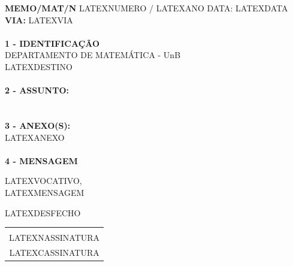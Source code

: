 \documentclass[12pt]{artigo_novo}
\begin{document}
\vspace*{.8cm}
\timbrado
\setlength{\baselineskip}{5mm}
\noindent 
\begin{minipage}{16cm}
\vspace*{-8mm}
\parindent=1.2cm
\setlength{\baselineskip}{5mm}
\vspace*{.2cm}
\noindent
\small
{\bf  MEMO/MAT/N\primo} LATEXNUMERO / LATEXANO \hfill {DATA:} {LATEXDATA}
\vum \\
{\bf VIA:} {LATEXVIA}  
\\
\mbox{} \hrulefill\
\\
{\bf 1 - IDENTIFICA\c{C}\~AO} 
\\
\phantom{xxx}{\bf Proced\^encia:} {DEPARTAMENTO DE MATEM\'ATICA - UnB}
\\
 {LATEXDESTINO}
\\
\mbox{} \hrulefill\
\\
{\bf 2 - ASSUNTO:} \\
\phantom{xxx}{LATEXASSUNTO}
\\
\mbox{} \hrulefill\
\\
{\bf 3 - ANEXO(S):} 
\\
\phantom{xxx} {LATEXANEXO}
\\
\mbox{} \hrulefill\
\\
{ \bf 4 - MENSAGEM} 
\end{minipage}
\setlength{\baselineskip}{5mm}
\vspace*{.92cm} 

LATEXVOCATIVO,
\vspace*{8mm} \\
\noindent 
LATEXMENSAGEM 
\vspace*{8mm} 
\hspace*{8cm} 
\setlength{\baselineskip}{5mm}
\vspace*{10mm} 

LATEXDESFECHO
\vspace*{15mm} \\
\begin{center} 
\begin{tabular}{c}
\hline \vspace*{-3mm}\\
LATEXNASSINATURA \\
{\small LATEXCASSINATURA}
%
\end{tabular} 
\end{center}
\end{document}
